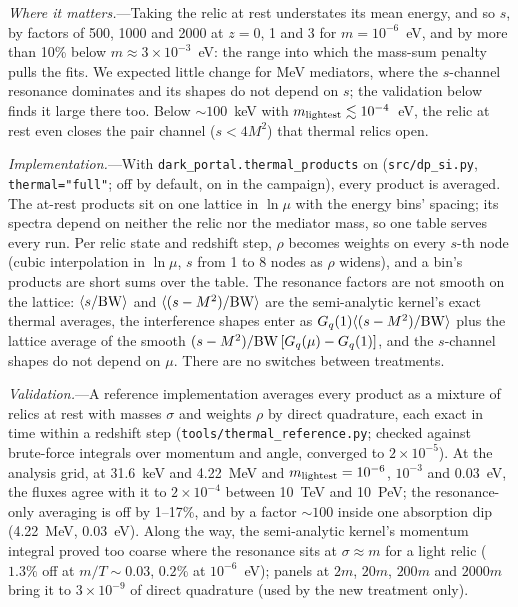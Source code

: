 \documentclass[11pt,a4paper]{article}
\newcommand{\file}[1]{\nolinkurl{#1}}
\begin{document}
\textit{Where it matters.}---Taking the relic at rest understates its mean energy, and so $s$, by
factors of 500, 1000 and 2000 at $z = 0$, 1 and 3 for $m = 10^{-6}$~eV, and by more than 10\% below
$m \approx 3\times10^{-3}$~eV: the range into which the mass-sum penalty pulls the fits. We
expected little change for MeV mediators, where the $s$-channel resonance dominates and its shapes
do not depend on $s$; the validation below finds it large there too. Below $\sim\!100$~keV with
$m_{\rm lightest} \lesssim 10^{-4}$~eV, the relic at rest even closes the pair channel
($s < 4M^2$) that thermal relics open.

\textit{Implementation.}---With \texttt{dark\_portal.thermal\_products} on (\file{src/dp\_si.py},
\texttt{thermal="full"}; off by default, on in the campaign), every product is averaged. The
at-rest products sit on one lattice in $\ln\mu$ with the energy bins' spacing; its spectra depend
on neither the relic nor the mediator mass, so one table serves every run. Per relic state and
redshift step, $\rho$ becomes weights on every $s$-th node (cubic interpolation in $\ln\mu$, $s$
from 1 to 8 nodes as $\rho$ widens), and a bin's products are short sums over the table. The
resonance factors are not smooth on the lattice: $\langle s/{\rm BW}\rangle$ and
$\langle (s-M^2)/{\rm BW}\rangle$ are the semi-analytic kernel's exact thermal averages, the
interference shapes enter as $G_q(1)\langle (s-M^2)/{\rm BW}\rangle$ plus the lattice average of
the smooth $(s-M^2)/{\rm BW}\,[G_q(\mu) - G_q(1)]$, and the $s$-channel shapes do not depend on
$\mu$. There are no switches between treatments.

\textit{Validation.}---A reference implementation averages every product as a mixture of relics at
rest with masses $\sigma$ and weights $\rho$ by direct quadrature, each exact in time within a
redshift step (\file{tools/thermal\_reference.py}; checked against brute-force integrals over
momentum and angle, converged to $2\times10^{-5}$). At the analysis grid, at 31.6~keV and 4.22~MeV
and $m_{\rm lightest} = 10^{-6}$, $10^{-3}$ and $0.03$~eV, the fluxes agree with it to
$2\times10^{-4}$ between 10~TeV and 10~PeV; the resonance-only averaging is off by 1--17\%, and by
a factor $\sim\!100$ inside one absorption dip (4.22~MeV, 0.03~eV). Along the way, the
semi-analytic kernel's momentum integral proved too coarse where the resonance sits at
$\sigma \approx m$ for a light relic ($1.3\%$ off at $m/T \sim 0.03$, $0.2\%$ at $10^{-6}$~eV);
panels at $2m$, $20m$, $200m$ and $2000m$ bring it to $3\times10^{-9}$ of direct quadrature (used
by the new treatment only).
\end{document}
